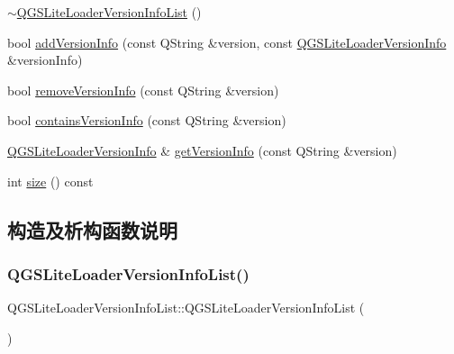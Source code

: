 \begin{DoxyCompactItemize}
\item 
\mbox{\hyperlink{class_q_g_s_lite_loader_version_info_list_a9be8a40ee18a05f0f3f61e636fc756e0}{$\sim$\+Q\+G\+S\+Lite\+Loader\+Version\+Info\+List}} ()
\item 
bool \mbox{\hyperlink{class_q_g_s_lite_loader_version_info_list_ac2a74c5ec70f9b5af5637cd1db24992d}{add\+Version\+Info}} (const Q\+String \&version, const \mbox{\hyperlink{class_q_g_s_lite_loader_version_info}{Q\+G\+S\+Lite\+Loader\+Version\+Info}} \&version\+Info)
\item 
bool \mbox{\hyperlink{class_q_g_s_lite_loader_version_info_list_a293da65761fc279eff3a7dd209b351dc}{remove\+Version\+Info}} (const Q\+String \&version)
\item 
bool \mbox{\hyperlink{class_q_g_s_lite_loader_version_info_list_a977a4cb304e11c54815b9a7873f2fe20}{contains\+Version\+Info}} (const Q\+String \&version)
\item 
\mbox{\hyperlink{class_q_g_s_lite_loader_version_info}{Q\+G\+S\+Lite\+Loader\+Version\+Info}} \& \mbox{\hyperlink{class_q_g_s_lite_loader_version_info_list_aaed1de24fed01d1c52f9e0d5179e9467}{get\+Version\+Info}} (const Q\+String \&version)
\item 
int \mbox{\hyperlink{class_q_g_s_lite_loader_version_info_list_aadc71fa7e8aeba54200a49da39e773eb}{size}} () const
\end{DoxyCompactItemize}


\subsection{构造及析构函数说明}
\mbox{\label{class_q_g_s_lite_loader_version_info_list_a4faa41a9bd3602858fb402d07d59e3f0}} 
\subsubsection{\texorpdfstring{Q\+G\+S\+Lite\+Loader\+Version\+Info\+List()}{QGSLiteLoaderVersionInfoList()}\hspace{0.1cm}{\footnotesize\ttfamily [1/3]}}
{\footnotesize\ttfamily Q\+G\+S\+Lite\+Loader\+Version\+Info\+List\+::\+Q\+G\+S\+Lite\+Loader\+Version\+Info\+List (\begin{DoxyParamCaption}{ }\end{DoxyParamCaption})}

